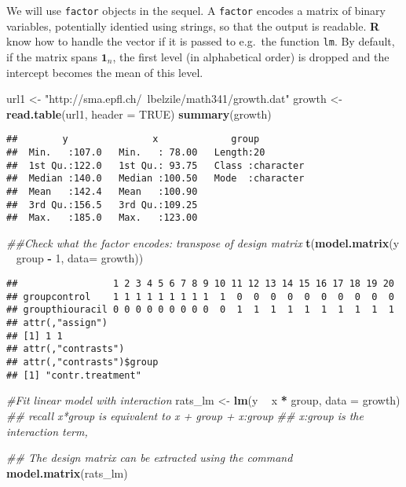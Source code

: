 \documentclass[]{book}
\newenvironment{Shaded}{\begin{snugshade}}{\end{snugshade}}
\newcommand{\CommentTok}[1]{\textcolor[rgb]{0.56,0.35,0.01}{\textit{#1}}}
\newcommand{\DataTypeTok}[1]{\textcolor[rgb]{0.13,0.29,0.53}{#1}}
\newcommand{\DecValTok}[1]{\textcolor[rgb]{0.00,0.00,0.81}{#1}}
\newcommand{\KeywordTok}[1]{\textcolor[rgb]{0.13,0.29,0.53}{\textbf{#1}}}
\newcommand{\NormalTok}[1]{#1}
\newcommand{\OperatorTok}[1]{\textcolor[rgb]{0.81,0.36,0.00}{\textbf{#1}}}
\newcommand{\OtherTok}[1]{\textcolor[rgb]{0.56,0.35,0.01}{#1}}
\newcommand{\StringTok}[1]{\textcolor[rgb]{0.31,0.60,0.02}{#1}}
\theoremstyle{definition}
\theoremstyle{definition}
\theoremstyle{definition}
\theoremstyle{remark}
\begin{document}
We will use \texttt{factor} objects in the sequel. A \texttt{factor}
encodes a matrix of binary variables, potentially identied using
strings, so that the output is readable. \textbf{R} know how to handle
the vector if it is passed to e.g.~the function \texttt{lm}. By default,
if the matrix spans \(\mathbf{1}_n\), the first level (in alphabetical
order) is dropped and the intercept becomes the mean of this level.

\begin{Shaded}
\begin{Highlighting}[]
\NormalTok{url1 <-}\StringTok{ "http://sma.epfl.ch/~lbelzile/math341/growth.dat"}
\NormalTok{growth <-}\StringTok{ }\KeywordTok{read.table}\NormalTok{(url1, }\DataTypeTok{header =} \OtherTok{TRUE}\NormalTok{)}
\KeywordTok{summary}\NormalTok{(growth)}
\end{Highlighting}
\end{Shaded}

\begin{verbatim}
##        y               x             group          
##  Min.   :107.0   Min.   : 78.00   Length:20         
##  1st Qu.:122.0   1st Qu.: 93.75   Class :character  
##  Median :140.0   Median :100.50   Mode  :character  
##  Mean   :142.4   Mean   :100.90                     
##  3rd Qu.:156.5   3rd Qu.:109.25                     
##  Max.   :185.0   Max.   :123.00
\end{verbatim}

\begin{Shaded}
\begin{Highlighting}[]
\CommentTok{##Check what the factor encodes: transpose of design matrix}
\KeywordTok{t}\NormalTok{(}\KeywordTok{model.matrix}\NormalTok{(y }\OperatorTok{~}\StringTok{ }\NormalTok{group }\OperatorTok{-}\StringTok{ }\DecValTok{1}\NormalTok{, }\DataTypeTok{data=}\NormalTok{ growth))}
\end{Highlighting}
\end{Shaded}

\begin{verbatim}
##                 1 2 3 4 5 6 7 8 9 10 11 12 13 14 15 16 17 18 19 20
## groupcontrol    1 1 1 1 1 1 1 1 1  1  0  0  0  0  0  0  0  0  0  0
## groupthiouracil 0 0 0 0 0 0 0 0 0  0  1  1  1  1  1  1  1  1  1  1
## attr(,"assign")
## [1] 1 1
## attr(,"contrasts")
## attr(,"contrasts")$group
## [1] "contr.treatment"
\end{verbatim}

\begin{Shaded}
\begin{Highlighting}[]
\CommentTok{#Fit linear model with interaction}
\NormalTok{rats_lm <-}\StringTok{ }\KeywordTok{lm}\NormalTok{(y }\OperatorTok{~}\StringTok{ }\NormalTok{x }\OperatorTok{*}\StringTok{ }\NormalTok{group, }\DataTypeTok{data =}\NormalTok{ growth)}
\CommentTok{## recall x*group is equivalent to x + group + x:group}
\CommentTok{## x:group is the interaction term,}

\CommentTok{## The design matrix can be extracted using the command}
\KeywordTok{model.matrix}\NormalTok{(rats_lm)}
\end{Highlighting}
\end{Shaded}
\end{document}
